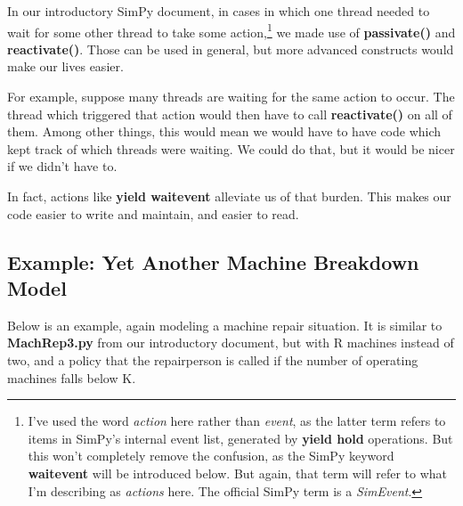 \documentclass[11pt]{article}
\begin{document}
In our introductory SimPy document, in cases in which one thread needed
to wait for some other thread to take some action,\footnote{I've used
the word {\it action} here rather than {\it event}, as the latter term
refers to items in SimPy's internal event list, generated by {\bf yield
hold} operations.  But this won't completely remove the confusion, as
the SimPy keyword {\bf waitevent} will be introduced below.  But again,
that term will refer to what I'm describing as {\it actions} here.  The
official SimPy term is a {\it SimEvent}.} we made use of {\bf
passivate()} and {\bf reactivate()}.  Those can be used in general, but
more advanced constructs would make our lives easier.

For example, suppose many threads are waiting for the same action to
occur.  The thread which triggered that action would then have to call
{\bf reactivate()} on all of them.  Among other things, this would mean
we would have to have code which kept track of which threads were
waiting.  We could do that, but it would be nicer if we didn't have to.

In fact, actions like {\bf yield waitevent} alleviate us of that burden.
This makes our code easier to write and maintain, and easier to read.

\subsection{Example:  Yet Another Machine Breakdown Model}

Below is an example, again modeling a machine repair situation.  It is
similar to {\bf MachRep3.py} from our introductory document, but with R
machines instead of two, and a policy that the repairperson is called if
the number of operating machines falls below K.
\end{document}
